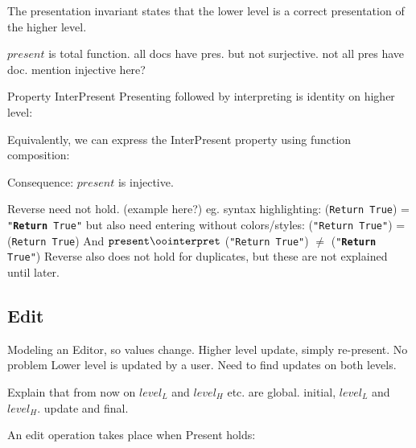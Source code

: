 
\bl
\* The presentation invariant states that the lower level is a correct presentation of the higher level.
\el


$present$ is total function. all docs have pres. but not surjective. not all pres have doc. mention injective here?


\bl
\* Property {\sc InterPresent} 
\* Presenting followed by interpreting is identity on higher level: 
\el


Equivalently, we can express the {\sc InterPresent} property using function composition: 


\bl
\* Consequence: $present$ is injective. 
\el

\bl
\* Reverse need not hold.  (example here?)
\* eg. syntax highlighting: \present ({\tt Return True}) = {\tt "{\bf Return} True"}
\* but also need entering without colors/styles: \interpret ({\tt "Return True"}) = ({\tt Return True})
\* And $\present \oo \interpret$ ({\tt "Return True"}) $\neq$ ({\tt "{\bf Return} True"}) 
\* Reverse also does not hold for duplicates, but these are not explained until later.
\el

\subsection{Edit}

\bl
\* Modeling an Editor, so values change.
\* Higher level update, simply re-present. No problem
\* Lower level is updated by a user. Need to find updates on both levels.
\el

Explain that from now on $level_L$ and $level_H$ etc. are global. initial, $level_L$ and $level_H$. update and final.

An edit operation takes place when {\sc Present} holds:


